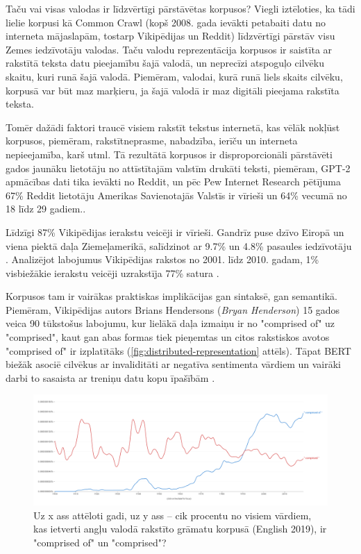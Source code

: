 
Taču vai visas valodas ir līdzvērtīgi pārstāvētas korpusos? Viegli iztēloties, ka tādi lielie korpusi kā Common Crawl (kopš 2008. gada ievākti petabaiti datu no interneta mājaslapām, tostarp Vikipēdijas un Reddit) līdzvērtīgi pārstāv visu Zemes iedzīvotāju valodas. Taču valodu reprezentācija korpusos ir saistīta ar rakstītā teksta datu pieejamību šajā valodā, un neprecīzi atspoguļo cilvēku skaitu, kuri runā šajā valodā. Piemēram, valodai, kurā runā liels skaits cilvēku, korpusā var būt maz marķieru, ja šajā valodā ir maz digitāli pieejama rakstīta teksta.

Tomēr dažādi faktori traucē visiem rakstīt tekstus internetā, kas vēlāk nokļūst korpusos, piemēram, rakstītneprasme, nabadzība, ierīču un interneta nepieejamība, karš utml. Tā rezultātā korpusos ir disproporcionāli pārstāvēti gados jaunāku lietotāju no attīstītajām valstīm drukāti teksti, piemēram, GPT-2 apmācības dati tika ievākti no Reddit, un pēc Pew Internet Research pētījuma 67\% Reddit lietotāju Amerikas Savienotajās Valstīs ir vīrieši un 64\% vecumā no 18 līdz 29 gadiem.\cite{bender2021}.

Līdzīgi 87\% Vikipēdijas ierakstu veicēji ir vīrieši. Gandrīz puse dzīvo Eiropā un viena piektā daļa Ziemeļamerikā, salīdzinot ar 9.7\% un 4.8\% pasaules iedzīvotāju \cite{wikimedia2020}. Analizējot labojumus Vikipēdijas rakstos no 2001. līdz 2010. gadam, 1\% visbiežākie ierakstu veicēji uzrakstīja 77\% satura \cite{1percent}.

Korpusos tam ir vairākas praktiskas implikācijas gan sintaksē, gan semantikā. Piemēram, Vikipēdijas autors Brians Hendersons (\textit{Bryan Henderson}) 15 gados veica 90 tūkstošus labojumu, kur lielākā daļa izmaiņu ir no "comprised of" uz "comprised", kaut gan abas formas tiek pieņemtas un citos rakstiskos avotos "comprised of" ir izplatītāks (\ref{fig:distributed-representation} attēls). Tāpat BERT biežāk asociē cilvēkus ar invaliditāti ar negatīva sentimenta vārdiem un vairāki darbi to sasaista ar treniņu datu kopu īpašībām \cite{bender2021}. 

\begin{figure}[h]
  \centering
  \includegraphics[width=\textwidth]{figures/comprised.png}
  \caption{Uz x ass attēloti gadi, uz y ass -- cik procentu no visiem vārdiem, kas ietverti angļu valodā rakstīto grāmatu korpusā (English 2019), ir "comprised of" un "comprised"? \cite{ngram-viewer}}
  \label{fig:comprised}
\end{figure}

